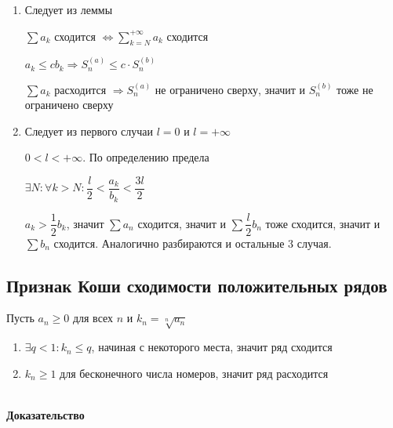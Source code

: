 \documentclass[../main.tex]{subfiles}
\begin{document}
                \begin{enumerate}
                
                    \item Следует из леммы
                    
                        $\sum a_k$ сходится $\Leftrightarrow \sum\limits^{+\infty}_{k = N} a_k$ сходится
                        
                        $a_k \leq c b_k \Rightarrow S_n^{(a)} \leq c \cdot S^{(b)}_n$
                        
                        $\sum a_k$ расходится $\Rightarrow S^{(a)}_n$ не ограничено сверху, значит и $S^{(b)}_n$ тоже не ограничено сверху
                        
                    \item Следует из первого случаи $l = 0$ и $l = +\infty$
                    
                        $0 < l < +\infty$. По определению предела
                        
                            $\exists N : \forall k > N : \dfrac{l}{2} < \dfrac{a_k}{b_k} < \dfrac{3l}{2}$
                            
                            $a_k > \dfrac{1}{2} b_k$, значит $\sum a_n$ сходится, значит и $\sum \dfrac{l}{2} b_n$ тоже сходится, значит и $\sum b_n$ сходится. Аналогично разбираются и остальные $3$ случая.
                    
                \end{enumerate}

\newpage


\subsection{Признак Коши сходимости положительных рядов}

          Пусть $a_n \geq 0$ для всех $n$ и $k_n = \sqrt[n]{a_n}$
            
            \begin{enumerate}
            
                \item $\exists q < 1 : k_n \leq q$, начиная с некоторого места, значит ряд сходится 
                
                \item $k_n \geq 1$ для бесконечного числа номеров, значит ряд расходится
                
            \end{enumerate}
 \\
\textbf{Доказательство}
        
\end{document}

